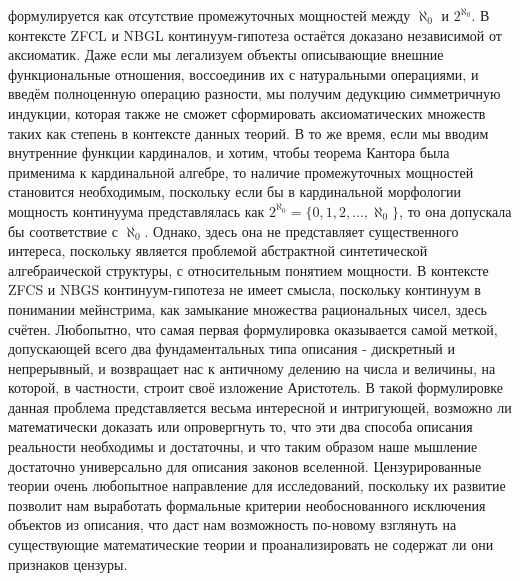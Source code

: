 \documentclass[12pt]{article}
\begin{document}
формулируется как отсутствие промежуточных мощностей между $\aleph_0$ и $2^{\aleph_0}$. В контексте ZFCL и NBGL континуум-гипотеза остаётся доказано независимой от аксиоматик. Даже если мы легализуем объекты описывающие внешние функциональные отношения, воссоединив их с натуральными операциями, и введём полноценную операцию разности, мы получим дедукцию симметричную индукции, которая также не сможет сформировать аксиоматических множеств таких как степень в контексте данных теорий. В то же время, если мы вводим внутренние функции кардиналов, и хотим, чтобы теорема Кантора была применима к кардинальной алгебре, то наличие промежуточных мощностей становится необходимым, поскольку если бы в кардинальной морфологии мощность континуума представлялась как $2^{\aleph_0} = \{0, 1, 2, \dots, \aleph_0\}$, то она допускала бы соответствие с $\aleph_0$. Однако, здесь она не представляет существенного интереса, поскольку является проблемой абстрактной синтетической алгебраической структуры, с относительным понятием мощности. В контексте ZFCS и NBGS континуум-гипотеза не имеет смысла, поскольку континуум в понимании мейнстрима, как замыкание множества рациональных чисел, здесь счётен. Любопытно, что самая первая формулировка оказывается самой меткой, допускающей всего два фундаментальных типа описания - дискретный и непрерывный, и возвращает нас к античному делению на числа и величины, на которой, в частности, строит своё изложение Аристотель. В такой формулировке данная проблема представляется весьма интересной и интригующей, возможно ли математически доказать или опровергнуть то, что эти два способа описания реальности необходимы и достаточны, и что таким образом наше мышление достаточно универсально для описания законов вселенной. Цензурированные теории очень любопытное направление для исследований, поскольку их развитие позволит нам выработать формальные критерии необоснованного исключения объектов из описания, что даст нам возможность по-новому взглянуть на существующие математические теории и проанализировать не содержат ли они признаков цензуры.
\end{document}
